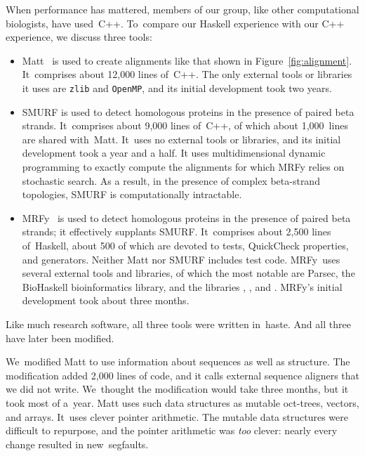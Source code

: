 \documentclass[]{jfp1}
\newcommand\mrfy{MRFy} %
\newcommand\figref[1]{Figure~\ref{fig:#1}}
\let\cite\citep
\begin{document}
When performance has mattered, members of our group, like other
computational biologists, have used~C++.
To~compare our Haskell experience with our C++ experience,
we discuss three tools:
\begin{itemize}
\item
Matt~\cite{Menke:2008wu} is used to create alignments like that shown
in \figref{alignment}.
It~comprises about 12,000 lines of~C++.
The only external tools or libraries it uses are \texttt{zlib}
and \texttt{OpenMP}, and its initial development took two years.
\item
SMURF
\cite{Menke:2010ti} is used to detect homologous proteins in the presence
of paired beta strands.
It~comprises about 9,000 lines of~C++, of which about 1,000~lines are
shared with~Matt.
It~uses no external tools or libraries, and
its initial development took a year and a half.
It uses multidimensional dynamic programming to exactly compute the alignments
for which MRFy relies on stochastic search.
As a result, in the presence of complex beta-strand topologies, SMURF is
computationally intractable.
\item
MRFy~\cite{daniels2015mrfy} is used to detect homologous proteins in the 
presence of paired
beta strands; it effectively supplants SMURF.
It~comprises about 2,500 lines of~Haskell, about 500 of which are devoted
to tests, QuickCheck properties, and generators.
Neither Matt nor SMURF includes test code.
MRFy~uses several external tools and libraries, of which the most
notable are Parsec, the BioHaskell bioinformatics library, and
the libraries , ,
and .
\mrfy's initial development took about three months.
\end{itemize}
Like much research software, all three tools were written
 in~haste.
And all three have later been modified.



We~modified Matt to use information about sequences as well as structure.
The modification added 2,000 lines of code, and it calls
external sequence aligners that we did not write.
We~thought the modification would take three months, 
but it took most of a~year.
Matt uses such
data structures as mutable oct-trees, vectors, and arrays.
It~uses clever pointer arithmetic.
The mutable data structures were difficult to 
repurpose, and the pointer arithmetic was \emph{too} clever: 
nearly every change resulted in new~segfaults.
\end{document}
